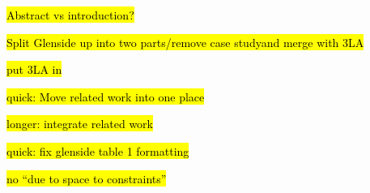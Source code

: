 \hl{Abstract vs introduction?}

\hl{Split Glenside up into two parts/remove case studyand merge with 3LA}

\hl{put 3LA in}

\hl{quick: Move related work into one place}

\hl{longer: integrate related work}

\hl{quick: fix glenside table 1 formatting}

\hl{no ``due to space to constraints''}

\clearpage
